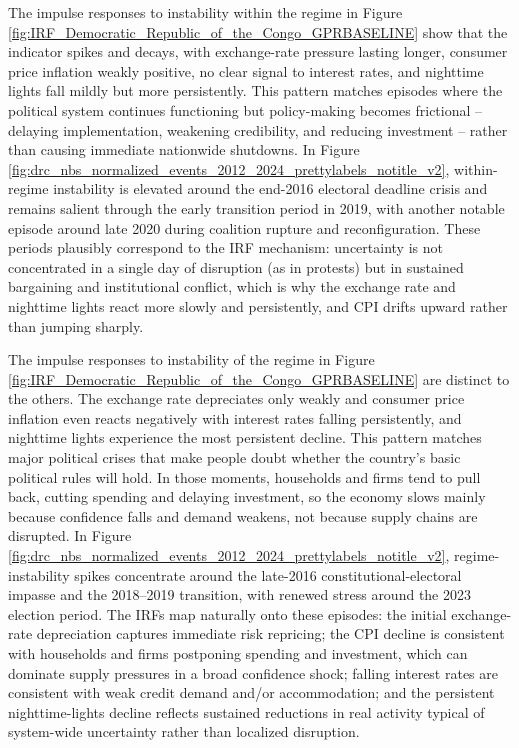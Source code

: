 \documentclass[12pt,a4paper,fleqn]{article}
\begin{document}
The impulse responses to instability within the regime in Figure \ref{fig:IRF_Democratic_Republic_of_the_Congo_GPRBASELINE} show that the indicator spikes and decays, with exchange-rate pressure lasting longer, consumer price inflation weakly positive, no clear signal to interest rates, and nighttime lights fall mildly but more persistently. This pattern matches episodes where the political system continues functioning but policy-making becomes frictional -- delaying implementation, weakening credibility, and reducing investment -- rather than causing immediate nationwide shutdowns. %
In Figure \ref{fig:drc_nbs_normalized_events_2012_2024_prettylabels_notitle_v2}, within-regime instability is elevated around the end-2016 electoral deadline crisis and remains salient through the early transition period in 2019, with another notable episode around late 2020 during coalition rupture and reconfiguration. These periods plausibly correspond to the IRF mechanism: uncertainty is not concentrated in a single day of disruption (as in protests) but in sustained bargaining and institutional conflict, which is why the exchange rate and nighttime lights react more slowly and persistently, and CPI drifts upward rather than jumping sharply.

The impulse responses to instability of the regime in Figure \ref{fig:IRF_Democratic_Republic_of_the_Congo_GPRBASELINE} are distinct to the others. The exchange rate depreciates only weakly and consumer price inflation even reacts negatively with interest rates falling persistently, and nighttime lights experience the most persistent decline. This pattern matches major political crises that make people doubt whether the country’s basic political rules will hold. In those moments, households and firms tend to pull back, cutting spending and delaying investment, so the economy slows mainly because confidence falls and demand weakens, not because supply chains are disrupted. In Figure \ref{fig:drc_nbs_normalized_events_2012_2024_prettylabels_notitle_v2}, regime-instability spikes concentrate around the late-2016 constitutional-electoral impasse and the 2018–2019 transition, with renewed stress around the 2023 election period. The IRFs map naturally onto these episodes: the initial exchange-rate depreciation captures immediate risk repricing; the CPI decline is consistent with households and firms postponing spending and investment, which can dominate supply pressures in a broad confidence shock; falling interest rates are consistent with weak credit demand and/or accommodation; and the persistent nighttime-lights decline reflects sustained reductions in real activity typical of system-wide uncertainty rather than localized disruption. %
\end{document}
